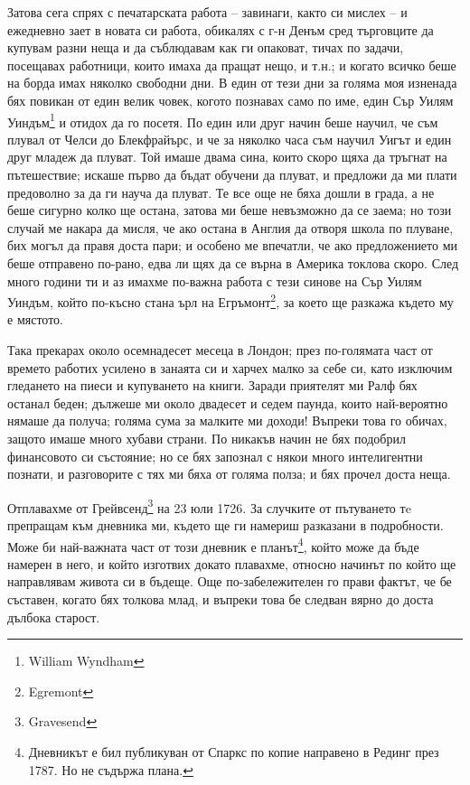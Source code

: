 \documentclass[12pt]{book}
\begin{document}
Затова сега спрях с печатарската работа – завинаги, както си мислех – и ежедневно зает в новата си работа, обикалях с г-н Денъм сред търговците да купувам разни неща и да съблюдавам как ги опаковат, тичах по задачи, посещавах работници, които имаха да пращат нещо, и т.н.; и когато всичко беше на борда имах няколко свободни дни. В един от тези дни за голяма моя изненада бях повикан от един велик човек, когото познавах само по име, един Сър Уилям Уиндъм\footnote{William Wyndham} и отидох да го посетя. По един или друг начин беше научил, че съм плувал от Челси до Блекфрайърс, и че за няколко часа съм научил Уигът и един друг младеж да плуват. Той имаше двама сина, които скоро щяха да тръгнат на пътешествие; искаше първо да бъдат обучени да плуват, и предложи да ми плати предоволно за да ги науча да плуват. Те все още не бяха дошли в града, а не беше сигурно колко ще остана, затова ми беше невъзможно да се заема; но този случай ме накара да мисля, че ако остана в Англия да отворя школа по плуване, бих могъл да правя доста пари; и особено ме впечатли, че ако предложението ми беше отправено по-рано, едва ли щях да се върна в Америка токлова скоро. След много години ти и аз имахме по-важна работа с тези синове на Сър Уилям Уиндъм, който по-късно стана ърл на Егръмонт\footnote{Egremont}, за което ще разкажа където му е мястото. 

Така прекарах около осемнадесет месеца в Лондон; през по-голямата част от времето работих усилено в занаята си и харчех малко за себе си, като изключим гледането на пиеси и купуването на книги. Заради приятелят ми Ралф бях останал беден; дължеше ми около двадесет и седем паунда, които най-вероятно нямаше да получа; голяма сума за малките ми доходи! Въпреки това го обичах, защото имаше много хубави страни. По никакъв начин не бях подобрил финансовото си състояние; но се бях запознал с някои много интелигентни познати, и разговорите с тях ми бяха от голяма полза; и бях прочел доста неща. 

Отплавахме от Грейвсенд\footnote{Gravesend} на 23 юли 1726. За случките от пътуването тe препращам към дневника ми, където ще ги намериш разказани в подробности. Може би най-важната част от този дневник е планът\footnote{Дневникът е бил публикуван от Спаркс по копие направено в Рединг през 1787. Но не съдържа плана.}, който може да бъде намерен в него, и който изготвих докато плавахме, относно начинът по който ще направлявам живота си в бъдеще. Още по-забележителен го прави фактът, че бе съставен, когато бях толкова млад, и въпреки това бе следван вярно до доста дълбока старост.
\end{document}
